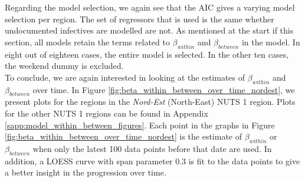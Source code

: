 \documentclass[12pt]{article}
\begin{document}
    Regarding the model selection, we again see that the AIC gives a varying model selection per region. The set of regressors that is used is the same whether undocumented infectives are modelled are not. As mentioned at the start if this section, all models retain the terms related to $\beta_{within}$ and $\beta_{between}$ in the model. In eight out of eighteen cases, the entire model is selected. In the other ten cases, the weekend dummy is excluded. \\
    
    To conclude, we are again interested in looking at the estimates of $\beta_{within}$ and $\beta_{between}$ over time. In Figure \ref{fig:beta_within_between_over_time_nordest}, we present plots for the regions in the \textit{Nord-Est} (North-East) NUTS 1 region. Plots for the other NUTS 1 regions can be found in Appendix \ref{sapp:model_within_between_figures}. Each point in the graphs in Figure \ref{fig:beta_within_between_over_time_nordest} is the estimate of $\beta_{within}$ or $\beta_{between}$ when only the latest 100 data points before that date are used. In addition, a LOESS curve with span parameter 0.3 is fit to the data points to give a better insight in the progression over time. \\
    
\end{document}
